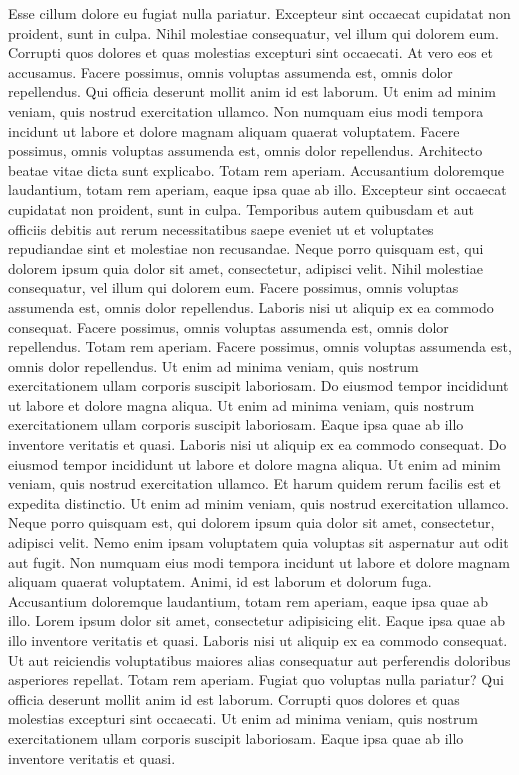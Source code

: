 \documentclass[
]{report}
\begin{document}
Esse cillum dolore eu fugiat nulla pariatur. Excepteur sint occaecat
cupidatat non proident, sunt in culpa. Nihil molestiae consequatur, vel
illum qui dolorem eum. Corrupti quos dolores et quas molestias excepturi
sint occaecati. At vero eos et accusamus. Facere possimus, omnis
voluptas assumenda est, omnis dolor repellendus. Qui officia deserunt
mollit anim id est laborum. Ut enim ad minim veniam, quis nostrud
exercitation ullamco. Non numquam eius modi tempora incidunt ut labore
et dolore magnam aliquam quaerat voluptatem. Facere possimus, omnis
voluptas assumenda est, omnis dolor repellendus. Architecto beatae vitae
dicta sunt explicabo. Totam rem aperiam. Accusantium doloremque
laudantium, totam rem aperiam, eaque ipsa quae ab illo. Excepteur sint
occaecat cupidatat non proident, sunt in culpa. Temporibus autem
quibusdam et aut officiis debitis aut rerum necessitatibus saepe eveniet
ut et voluptates repudiandae sint et molestiae non recusandae. Neque
porro quisquam est, qui dolorem ipsum quia dolor sit amet, consectetur,
adipisci velit. Nihil molestiae consequatur, vel illum qui dolorem eum.
Facere possimus, omnis voluptas assumenda est, omnis dolor repellendus.
Laboris nisi ut aliquip ex ea commodo consequat. Facere possimus, omnis
voluptas assumenda est, omnis dolor repellendus. Totam rem aperiam.
Facere possimus, omnis voluptas assumenda est, omnis dolor repellendus.
Ut enim ad minima veniam, quis nostrum exercitationem ullam corporis
suscipit laboriosam. Do eiusmod tempor incididunt ut labore et dolore
magna aliqua. Ut enim ad minima veniam, quis nostrum exercitationem
ullam corporis suscipit laboriosam. Eaque ipsa quae ab illo inventore
veritatis et quasi. Laboris nisi ut aliquip ex ea commodo consequat. Do
eiusmod tempor incididunt ut labore et dolore magna aliqua. Ut enim ad
minim veniam, quis nostrud exercitation ullamco. Et harum quidem rerum
facilis est et expedita distinctio. Ut enim ad minim veniam, quis
nostrud exercitation ullamco. Neque porro quisquam est, qui dolorem
ipsum quia dolor sit amet, consectetur, adipisci velit. Nemo enim ipsam
voluptatem quia voluptas sit aspernatur aut odit aut fugit. Non numquam
eius modi tempora incidunt ut labore et dolore magnam aliquam quaerat
voluptatem. Animi, id est laborum et dolorum fuga. Accusantium
doloremque laudantium, totam rem aperiam, eaque ipsa quae ab illo. Lorem
ipsum dolor sit amet, consectetur adipisicing elit. Eaque ipsa quae ab
illo inventore veritatis et quasi. Laboris nisi ut aliquip ex ea commodo
consequat. Ut aut reiciendis voluptatibus maiores alias consequatur aut
perferendis doloribus asperiores repellat. Totam rem aperiam. Fugiat quo
voluptas nulla pariatur? Qui officia deserunt mollit anim id est
laborum. Corrupti quos dolores et quas molestias excepturi sint
occaecati. Ut enim ad minima veniam, quis nostrum exercitationem ullam
corporis suscipit laboriosam. Eaque ipsa quae ab illo inventore
veritatis et quasi.
\end{document}
